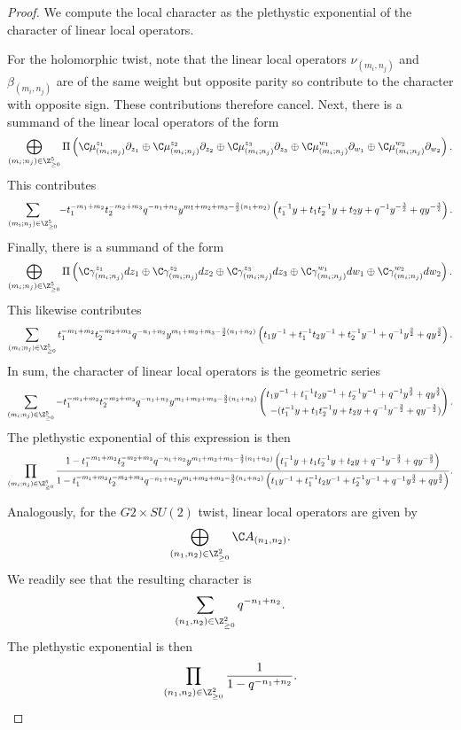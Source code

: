 \begin{proof}
We compute the local character as the plethystic exponential of the character of linear local operators. 

For the holomorphic twist, note that the linear local operators $ \nu_{(m_i, n_j)}$ and $\beta_{(m_i, n_j)}$ are of the same weight but opposite parity so contribute to the character with opposite sign. These contributions therefore cancel. Next, there is a summand of the linear local operators of the form 
\[
\bigoplus _{(m_i;n_j)\in \Z^5_{\geq 0 }} \Pi \left ( \C\mu^{z_1}_{(m_i; n_j)}\partial_{z_1}\oplus \C\mu^{z_2}_{(m_i; n_j)}\partial_{z_2}\oplus \C\mu^{z_3}_{(m_i; n_j)}\partial_{z_3}\oplus\C\mu^{w_1}_{(m_i; n_j)}\partial_{w_1}\oplus \C\mu^{w_2}_{(m_i; n_j)}\partial_{w_2}\right).
\] 
This contributes 
\[
\sum_{(m_i;n_j)\in \Z^5_{\geq 0 }}- t_1^{-m_1+m_2}t_2^{-m_2+m_3}q^{-n_1+n_2}y^{m_1+m_2+m_3-\frac 3 2 (n_1+n_2)}\left (t_1^{-1}y + t_1t_2^{-1}y + t_2y + q^{-1}y^{-\frac 3 2} + qy^{-\frac 3 2} \right).
\] 
Finally, there is a summand of the form 
\[
\bigoplus _{(m_i;n_j)\in \Z^5_{\geq 0 }} \Pi \left ( \C\gamma^{z_1}_{(m_i; n_j)}d{z_1}\oplus \C\gamma^{z_2}_{(m_i; n_j)}d{z_2}\oplus\C\gamma^{z_3}_{(m_i; n_j)}d{z_3}\oplus\C\gamma^{w_1}_{(m_i; n_j)}d{w_1}\oplus \C\gamma^{w_2}_{(m_i; n_j)}d {w_2}\right).
\] 
This likewise contributes 
\[
\sum_{(m_i;n_j)\in \Z^5_{\geq 0 }}t_1^{-m_1+m_2}t_2^{-m_2+m_3}q^{-n_1+n_2}y^{m_1+m_2+m_3-\frac 3 2 (n_1+n_2)}\left (t_1y^{-1} + t_1^{-1}t_2y^{-1} + t_2^{-1}y^{-1} + q^{-1}y^{\frac 3 2} + qy^{\frac 3 2} \right).
\] 
In sum, the character of linear local operators is the geometric series 
\[
\sum_{(m_i;n_j)\in \Z^5_{\geq 0 }}-t_1^{-m_1+m_2}t_2^{-m_2+m_3}q^{-n_1+n_2}y^{m_1+m_2+m_3-\frac 3 2 (n_1+n_2)}\left (\begin{aligned}t_1y^{-1} + t_1^{-1}t_2y^{-1} + t_2^{-1}y^{-1} + q^{-1}y^{\frac 3 2} + qy^{\frac 3 2} \\  - (t_1^{-1}y + t_1t_2^{-1}y + t_2y + q^{-1}y^{-\frac 3 2} + qy^{-\frac 3 2})\end{aligned}\right).
\] 
The plethystic exponential of this expression is then 
\[
\prod_ {(m_i;n_j)\in \Z^5_{\geq 0}}\frac{1- t_1^{-m_1+m_2}t_2^{-m_2+m_3}q^{-n_1+n_2}y^{m_1+m_2+m_3-\frac 3 2 (n_1+n_2)}\left (t_1^{-1}y + t_1t_2^{-1}y + t_2y + q^{-1}y^{-\frac 3 2} + qy^{-\frac 3 2} \right)}{1- t_1^{-m_1+m_2}t_2^{-m_2+m_3}q^{-n_1+n_2}y^{m_1+m_2+m_3-\frac 3 2 (n_1+n_2)}\left (t_1y^{-1} + t_1^{-1}t_2y^{-1} + t_2^{-1}y^{-1} + q^{-1}y^{\frac 3 2} + qy^{\frac 3 2} \right)}.
\]

Analogously, for the $G2\times SU(2)$ twist, linear local operators are given by \[\bigoplus_{(n_1,n_2)\in \Z^2_{\geq 0}} \C A_{(n_1,n_2)}.\] We readily see that the resulting character is \[\sum _{(n_1,n_2)\in \Z^2_{\geq 0}} q^{-n_1+n_2}.\] The plethystic exponential is then \[\prod _{(n_1,n_2)\in \Z^2_{\geq 0}} \frac{1}{1-q^{-n_1+n_2}}.\]


\end{proof}
